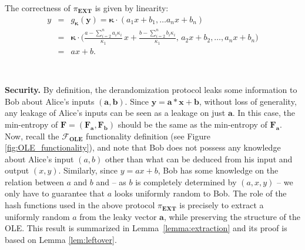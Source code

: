 The correctness of $\mathcal{\pi}_{\textbf{EXT}}$ is given by linearity:
\begin{eqnarray*}
y &=& g_{\bm{\kappa}}(\bm{y}) = \bm{\kappa} \cdot (a_1 x + b_1 ,\ldots a_n x + b_n) \\
&=& \bm{\kappa} \cdot \Bigg(\frac{a - \sum_{i=2}^{n} a_i \kappa_i}{
\kappa_1}\, x + \frac{b - \sum_{i=2}^{n} b_i \kappa_i}{\kappa_1},\, a_2 x + b_2, \ldots , a_n x + b_n \Bigg)\\
&=& a x + b.
\end{eqnarray*}

\

\noindent\textbf{Security.} 
By definition, the derandomization protocol leaks some information to Bob about Alice's inputs $(\bm{a}, \bm{b})$. Since $\bm{y = a  * x + b}$, without loss of generality, any leakage of Alice's inputs can be seen as a leakage on just $\bm{a}$. In this case, the min-entropy of $\mathbf{F} = (\mathbf{F}_{\bm{a}}, \mathbf{F}_{\bm{b}})$ should be the same as the min-entropy of $\mathbf{F}_{\bm{a}}$. Now, recall the $\mathcal{F}_{\textbf{OLE}}$ functionality definition (see Figure \ref{fig:OLE_functionality}),  and note that Bob does not possess any knowledge about Alice's input $(a,b)$ other than what can be deduced from his input and output $(x, y)$. Similarly, since $y = ax + b$, Bob has some knowledge on the relation between $a$ and $b$ and --  as $b$ is completely determined by $(a,x,y)$ --  we only have to guarantee that $a$ looks uniformly random to Bob. The role of the hash functions used in the above protocol $\mathcal{\pi}_{\textbf{EXT}}$ is precisely to extract a uniformly random $a$ from the leaky vector $\bm{a}$, while preserving the structure of the OLE. This result is summarized in Lemma~\ref{lemma:extraction} and its proof is based on  Lemma \ref{lem:leftover}. 



